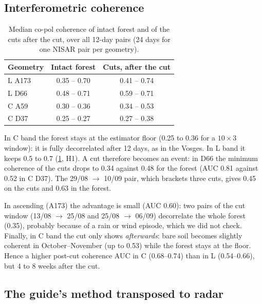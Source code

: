 \subsection{Interferometric coherence}

\begin{table}[H]
\centering\small
\caption{Median co-pol coherence of intact forest and of the cuts after the cut, over all 12-day pairs (24 days
for one NISAR pair per geometry).}
\label{tab-coh}
\begin{tabular}{lcc}
\toprule
Geometry & Intact forest & Cuts, after the cut \\
\midrule
L A173 & 0.35 -- 0.70 & 0.41 -- 0.74 \\
L D66 & 0.48 -- 0.71 & 0.59 -- 0.71 \\
C A59 & 0.30 -- 0.36 & 0.34 -- 0.53 \\
C D37 & 0.25 -- 0.27 & 0.27 -- 0.38 \\
\bottomrule
\end{tabular}
\end{table}

In C band the forest stays at the estimator floor (0.25 to 0.36 for a $10\times3$ window): it is fully
decorrelated after 12 days, as in the Vosges. In L band it keeps 0.5 to 0.7 (\cref{tab-coh}, H1). A cut
therefore becomes an event: in D66 the minimum coherence of the cuts drops to 0.34 against 0.48 for the forest
(AUC 0.81 against 0.52 in C D37). The 29/08 $\to$ 10/09 pair, which brackets three cuts, gives 0.45 on the cuts
and 0.63 in the forest.

In ascending (A173) the advantage is small (AUC 0.60): two pairs of the cut window (13/08 $\to$ 25/08 and
25/08 $\to$ 06/09) decorrelate the whole forest (0.35), probably because of a rain or wind episode, which we did
not check. Finally, in C band the cut only shows \emph{afterwards}: bare soil becomes slightly coherent in
October--November (up to 0.53) while the forest stays at the floor. Hence a higher post-cut coherence AUC in C
(0.68--0.74) than in L (0.54--0.66), but 4 to 8 weeks after the cut.

\subsection{The guide's method transposed to radar}

\begin{table}[H]
\centering\small
\caption{The guide's method on cross-pol $\Delta\gamma^0$ (best degree per geometry): area confusion matrix, share
of cuts found (at least 25~\% of their pixels) and false alarms as a share of the forest.}
\label{tab-guide}
\resizebox{\linewidth}{!}{}
\end{table}

